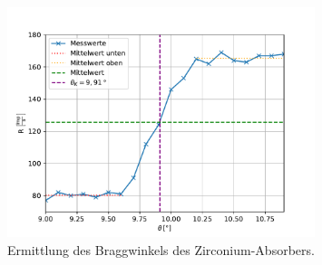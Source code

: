 \begin{figure}[H]
  \centering
  \includegraphics[width=0.80\textwidth]{content/Plots/Zirkonium.pdf}
  \caption{Ermittlung des Braggwinkels des Zirconium-Absorbers.}
  \label{fig:Zirkonium}
\end{figure}
